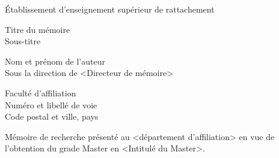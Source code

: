 \begin{titlepage}
\begin{center}
{Établissement d'enseignement supérieur de rattachement} \vspace{1.5 cm}\\
\end{center}
\begin{center}
\Huge{{Titre du mémoire}\\

\Large{Sous-titre}}
\end{center}
\vspace{1.5 cm}
\begin{center}
\normalsize{Nom et prénom de l'auteur \\ Sous la direction de <Directeur de mémoire>}
\vspace{1.5 cm}
\end{center}
\begin{center}
Faculté d'affiliation\\
Numéro et libellé de voie\\
Code postal et ville, pays
\end{center}
\vspace{1.5 cm}
\begin{center}
Mémoire de recherche présenté au <département d'affiliation> en vue de l'obtention du grade Master en <Intitulé du Master>.
\end{center}
\vspace{1.5 cm}
\end{titlepage}
